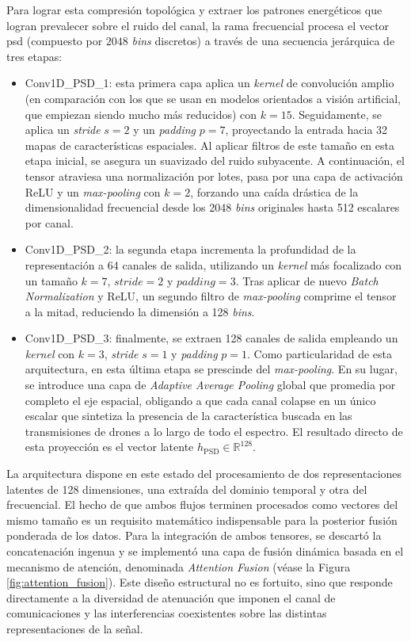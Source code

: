 Para lograr esta compresión topológica y extraer los patrones energéticos que logran prevalecer sobre el ruido del canal, la rama frecuencial procesa el vector \gls{psd} (compuesto por $2048$ \textit{bins} discretos) a través de una secuencia jerárquica de tres etapas:
\begin{itemize}
    \item Conv1D\_PSD\_1: esta primera capa aplica un \textit{kernel} de convolución amplio (en comparación con los que se usan en modelos orientados a visión artificial, que empiezan siendo mucho más reducidos) con $k=15$. Seguidamente, se aplica un \textit{stride} $s=2$ y un \textit{padding} $p=7$, proyectando la entrada hacia 32 mapas de características espaciales. Al aplicar filtros de este tamaño en esta etapa inicial, se asegura un suavizado del ruido subyacente. A continuación, el tensor atraviesa una normalización por lotes, pasa por una capa de activación ReLU y un \textit{max-pooling} con $k=2$, forzando una caída drástica de la dimensionalidad frecuencial desde los 2048 \textit{bins} originales hasta 512 escalares por canal.
    
    \item Conv1D\_PSD\_2: la segunda etapa incrementa la profundidad de la representación a 64 canales de salida, utilizando un \textit{kernel} más focalizado con un tamaño $k=7$, $\textit{stride}=2$ y $\textit{padding}=3$. Tras aplicar de nuevo \textit{Batch Normalization} y ReLU, un segundo filtro de \textit{max-pooling} comprime el tensor a la mitad, reduciendo la dimensión a 128 \textit{bins}.
    
    \item Conv1D\_PSD\_3: finalmente, se extraen 128 canales de salida empleando un \textit{kernel} con $k=3$, \textit{stride} $s=1$ y \textit{padding} $p=1$. Como particularidad de esta arquitectura, en esta última etapa se prescinde del \textit{max-pooling}. En su lugar, se introduce una capa de \textit{Adaptive Average Pooling} global que promedia por completo el eje espacial, obligando a que cada canal colapse en un único escalar que sintetiza la presencia de la característica buscada en las transmisiones de drones a lo largo de todo el espectro. El resultado directo de esta proyección es el vector latente $h_{\text{PSD}} \in \mathbb{R}^{128}$.
\end{itemize}

La arquitectura dispone en este estado del procesamiento de dos representaciones latentes de 128 dimensiones, una extraída del dominio temporal y otra del frecuencial. El hecho de que ambos flujos terminen procesados como vectores del mismo tamaño es un requisito matemático indispensable para la posterior fusión ponderada de los datos.
Para la integración de ambos tensores, se descartó la concatenación ingenua y se implementó una capa de fusión dinámica basada en el mecanismo de atención, denominada \textit{Attention Fusion} (véase la Figura \ref{fig:attention_fusion}). Este diseño estructural no es fortuito, sino que responde directamente a la diversidad de atenuación que imponen el canal de comunicaciones y las interferencias coexistentes sobre las distintas representaciones de la señal. 

